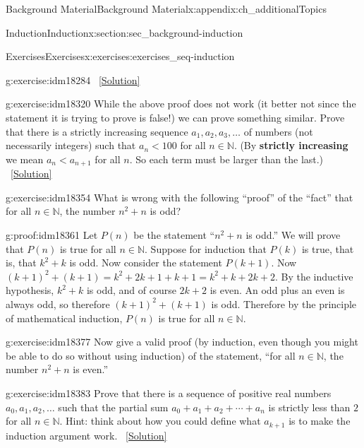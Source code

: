 \documentclass[oneside,10pt,]{book}
\newcommand{\terminology}[1]{\textbf{#1}}
\numberwithin{equation}{chapter}
\def\N{\mathbb N}
\newcommand{\lt}{<}
\begin{document}
\begin{appendixptx}{Background Material}{}{Background Material}{}{}{x:appendix:ch_additionalTopics}
\begin{sectionptx}{Induction}{}{Induction}{}{}{x:section:sec_background-induction}
\begin{exercises-subsection}{Exercises}{}{Exercises}{}{}{x:exercises:exercises_seq-induction}
\begin{divisionexercise}{12}{}{}{g:exercise:idm18284}
\qquad~\hfill{\tiny\hyperlink{g:solution:idm18310-main}{[Solution]}}\end{divisionexercise}%
\begin{divisionexercise}{13}{}{}{g:exercise:idm18320}%
While the above proof does not work (it better not since the statement it is trying to prove is false!) we can prove something similar. Prove that there is a strictly increasing sequence \(a_1, a_2, a_3, \ldots\) of numbers (not necessarily integers) such that \(a_n \lt  100\) for all \(n \in \N\). (By \terminology{strictly increasing} we mean \(a_n \lt  a_{n+1}\) for all \(n\). So each term must be larger than the last.)%
\qquad~\hfill{\tiny\hyperlink{g:solution:idm18329-main}{[Solution]}}\end{divisionexercise}%
\begin{divisionexercise}{14}{}{}{g:exercise:idm18354}%
What is wrong with the following ``proof'' of the ``fact'' that for all \(n \in \N\), the number \(n^2 + n\) is odd?%
\begin{proofptx}{}{g:proof:idm18361}
Let \(P(n)\) be the statement ``\(n^2 + n\) is odd.'' We will prove that \(P(n)\) is true for all \(n \in \N\). Suppose for induction that \(P(k)\) is true, that is, that \(k^2 + k\) is odd. Now consider the statement \(P(k+1)\). Now \((k+1)^2 + (k+1) = k^2 + 2k + 1 + k + 1 = k^2 + k + 2k + 2\). By the inductive hypothesis, \(k^2 + k\) is odd, and of course \(2k + 2\) is even. An odd plus an even is always odd, so therefore \((k+1)^2 + (k+1)\) is odd. Therefore by the principle of mathematical induction, \(P(n)\) is true for all \(n \in \N\).%
\end{proofptx}
\end{divisionexercise}%
\begin{divisionexercise}{15}{}{}{g:exercise:idm18377}%
Now give a valid proof (by induction, even though you might be able to do so without using induction) of the statement, ``for all \(n \in \N\), the number \(n^2 + n\) is even.''%
\end{divisionexercise}%
\begin{divisionexercise}{16}{}{}{g:exercise:idm18383}%
Prove that there is a sequence of positive real numbers \(a_0, a_1, a_2, \ldots\) such that the partial sum \(a_0 + a_1 + a_2 + \cdots + a_n\) is strictly less than \(2\) for all \(n \in \N\). Hint: think about how you could define what \(a_{k+1}\) is to make the induction argument work.%
\qquad~\hfill{\tiny\hyperlink{g:solution:idm18391-main}{[Solution]}}\end{divisionexercise}%

\end{exercises-subsection}
\end{sectionptx}
\end{appendixptx}
\end{document}
